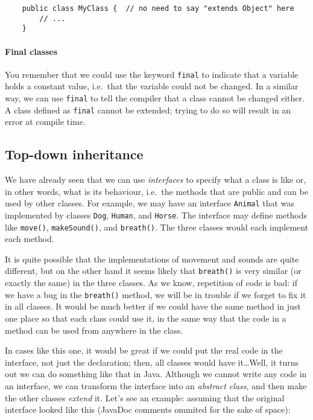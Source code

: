 \begin{verbatim}
    public class MyClass {  // no need to say "extends Object" here
        // ...              
    }
\end{verbatim}

\paragraph{Final classes}
\label{sec:final-classes}

You remember that we could use the keyword \verb+final+ to indicate
that a variable holds a constant value, i.e.~that the variable could
not be changed. In a similar way, we can use \verb+final+ to tell the compiler
that a class cannot be changed either. A class defined as \verb+final+
cannot be extended; trying to do so will result in an error at compile
time. 


\subsection{Top-down inheritance}
\label{sec:top-down-inheritance}

We have already seen that we can use \emph{interfaces} to specify what a
class is like or, in other words, what is its behaviour, i.e.~the methods
that are public and can be used by other classes. For example, we may
have an interface \verb+Animal+ that was implemented by classes
\verb+Dog+, \verb+Human+, and \verb+Horse+. The interface may define
methods like \verb+move()+, \verb+makeSound()+, and
\verb+breath()+. The three classes would each implement each method. 

It is quite possible that the implementations of movement and
sounds are quite different, but on the other hand it seems likely that
\verb+breath()+ is very similar (or exactly the same) in the three
classes. As we know, repetition of code is bad: if we have a bug
in the \verb+breath()+ method, we will be in trouble if we forget to
fix it in all classes. It would be much better if we could have the
same method in just one place so that each class could use it, in the
same way that the code in a method can be used from anywhere in the
class. 

In cases like this one, it would be great if we could put the 
real code in the interface, not just the declaration; then, all
classes would have it\ldots Well, it turns out we can do something like
that in Java. Although we cannot write any code in an interface, 
we can transform the interface into an \emph{abstract class}, and then
make the other classes \emph{extend} it. Let's see an example: assuming
that the original interface looked like this (JavaDoc comments ommited
for the sake of space):

